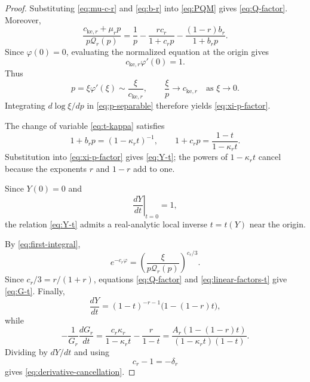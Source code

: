 \documentclass[10pt,a4paper]{amsart}
\begin{document}
\begin{proof}
Substituting \eqref{eq:mu-c-r} and \eqref{eq:b-r} into
\eqref{eq:PQM} gives \eqref{eq:Q-factor}. Moreover,
\[
 \frac{c_{\mathrm{ke},r}+\mu_rp}{p\mathcal Q_r(p)}
 =\frac1p-\frac{rc_r}{1+c_rp}
 -\frac{(1-r)b_r}{1+b_rp}.
\]
Since \(\varphi(0)=0\), evaluating the normalized equation at the origin
gives
\[
 c_{\mathrm{ke},r}\varphi'(0)=1.
\]
Thus
\[
 p=\xi\varphi'(\xi)\sim\frac{\xi}{c_{\mathrm{ke},r}},
 \qquad
 \frac{\xi}{p}\longrightarrow c_{\mathrm{ke},r}
 \quad\text{as }\xi\to0.
\]
Integrating \(d\log\xi/dp\) in \eqref{eq:p-separable} therefore yields
\eqref{eq:xi-p-factor}.

The change of variable \eqref{eq:t-kappa} satisfies
\begin{equation}\label{eq:linear-factors-t}
 1+b_rp=(1-\kappa_rt)^{-1},
 \qquad
 1+c_rp=\frac{1-t}{1-\kappa_rt}.
\end{equation}
Substitution into \eqref{eq:xi-p-factor} gives \eqref{eq:Y-t}; the powers
of \(1-\kappa_rt\) cancel because the exponents \(r\) and \(1-r\) add
to one.

Since \(Y(0)=0\) and
\[
 \left.\frac{dY}{dt}\right|_{t=0}=1,
\]
the relation \eqref{eq:Y-t} admits a real-analytic local inverse
\(t=t(Y)\) near the origin.

By \eqref{eq:first-integral},
\[
 e^{-c_r\varphi}
 =\left(\frac{\xi}{p\mathcal Q_r(p)}\right)^{c_r/3}.
\]
Since \(c_r/3=r/(1+r)\), equations \eqref{eq:Q-factor} and
\eqref{eq:linear-factors-t} give \eqref{eq:G-t}. Finally,
\[
 \frac{dY}{dt}
 =(1-t)^{-r-1}\bigl(1-(1-r)t\bigr),
\]
while
\[
 -\frac1{G_r}\frac{dG_r}{dt}
 =\frac{c_r\kappa_r}{1-\kappa_rt}-\frac{r}{1-t}
 =\frac{A_r(1-(1-r)t)}
 {(1-\kappa_rt)(1-t)}.
\]
Dividing by \(dY/dt\) and using
\[
 c_r-1=-\delta_r
\]
gives \eqref{eq:derivative-cancellation}.
\end{proof}
\end{document}
